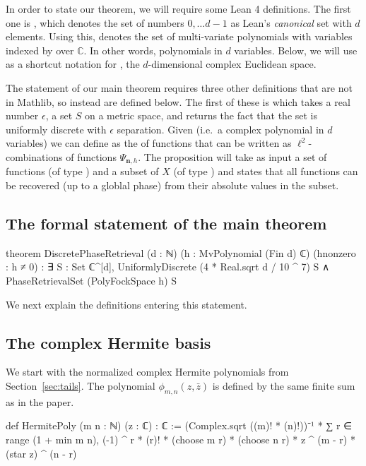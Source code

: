 \documentclass[11pt]{amsart}
\begin{document}
In order to state our theorem, we will require some Lean 4 definitions. The first one is , which denotes the set of numbers $0,\dots d-1$ as Lean's \emph{canonical} set with $d$ elements. Using this,  denotes the set of multi-variate polynomials with variables indexed by  over $\mathbb C$. In other words, polynomials in $d$ variables. Below, we will use  as a shortcut notation for , the $d$-dimensional complex Euclidean space.

The statement of our main theorem requires three other definitions that are not in Mathlib, so instead are defined below. The first of these is  which takes a real number $\epsilon$, a set $S$ on a metric space, and returns the fact that the set is uniformly discrete with $\epsilon$ separation. Given  (i.e.~a complex polynomial in $d$ variables) we can define  as the  of functions that can be written as $\ell^2$-combinations of functions $\Psi_{\mathbf n, h}$.  The proposition  will take as input a set of functions (of type ) and a subset of $X$ (of type ) and states that all functions can be recovered (up to a globlal phase) from their absolute values in the subset.
\subsection{The formal statement of the main theorem}


\begin{leancode}
theorem DiscretePhaseRetrieval
    (d : ℕ) (h : MvPolynomial (Fin d) ℂ) (hnonzero : h ≠ 0) :
    ∃ S : Set ℂ^[d],
      UniformlyDiscrete (4 * Real.sqrt d / 10 ^ 7) S ∧
        PhaseRetrievalSet (PolyFockSpace h) S
\end{leancode}

We next explain the definitions entering this statement.

\subsection{The complex Hermite basis}

We start with the normalized complex Hermite polynomials from
Section~\ref{sec:tails}. The polynomial $\phi_{m,n}(z,\bar z)$ is defined by
the same finite sum as in the paper.

\begin{leancode}
def HermitePoly (m n : ℕ) (z : ℂ) : ℂ :=
    (Complex.sqrt ((m)! * (n)!))⁻¹ *
      ∑ r ∈ range (1 + min m n),
      (-1) ^ r * (r)! * (choose m r) * (choose n r) *
      z ^ (m - r) * (star z) ^ (n - r)
\end{leancode}
\end{document}
